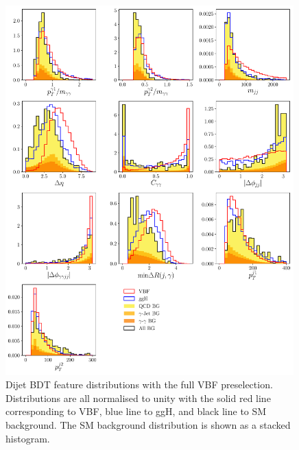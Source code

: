 \begin{figure}[h!]
    \centering
    \includegraphics[width=0.99\textwidth]{figures/event_selection/dijet_BDT_features_splitBG_PS.pdf}
    \caption{Dijet BDT feature distributions with the full VBF preselection. Distributions are all normalised to unity with the solid red line corresponding to VBF, blue line to ggH, and black line to SM background. The SM background distribution is shown as a stacked histogram.}
    \label{fig:event_categorisaton:dijet_bdt_features}
\end{figure}


